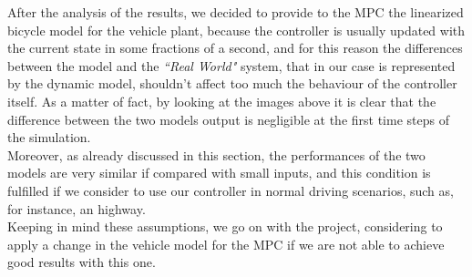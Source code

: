 After the analysis of the results, we decided to provide to the MPC the linearized bicycle model for the vehicle plant, because the controller is usually updated with the current state in some fractions of a second, and for this reason the differences between the model and the \textit{``Real World"} system, that in our case is represented by the dynamic model, shouldn't affect too much the behaviour of the controller itself. As a matter of fact, by looking at the images above it is clear that the difference between the two models output is negligible at the first time steps of the simulation.\\
Moreover, as already discussed in this section, the performances of the two models are very similar if compared with small inputs, and this condition is fulfilled if we consider to use our controller in normal driving scenarios, such as, for instance, an highway.\\
Keeping in mind these assumptions, we go on with the project, considering to apply a change in the vehicle model for the MPC if we are not able to achieve good results with this one.